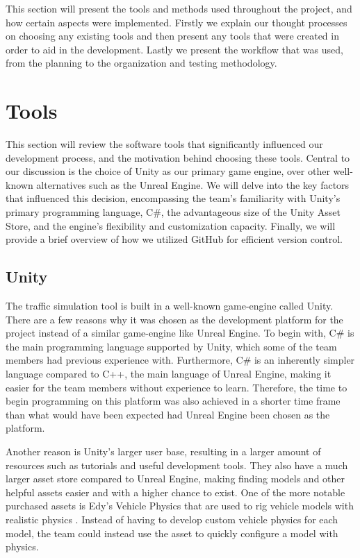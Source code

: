 
This section will present the tools and methods used throughout the project, and how certain aspects were implemented. Firstly we explain our thought processes on choosing any existing tools and then present any tools that were created in order to aid in the development. Lastly we present the workflow that was used, from the planning to the organization and testing methodology.

\section{Tools}
    This section will review the software tools that significantly influenced our development process, and the motivation behind choosing these tools. Central to our discussion is the choice of Unity as our primary game engine, over other well-known alternatives such as the Unreal Engine. We will delve into the key factors that influenced this decision, encompassing the team's familiarity with Unity's primary programming language, C\#, the advantageous size of the Unity Asset Store, and the engine's flexibility and customization capacity. Finally, we will provide a brief overview of how we utilized GitHub for efficient version control.

    \subsection{Unity}
        The traffic simulation tool is built in a well-known game-engine called Unity. There are a few reasons why it was chosen as the development platform for the project instead of a similar game-engine like Unreal Engine. To begin with, C\# is the main programming language supported by Unity, which some of the team members had previous experience with. Furthermore, C\# is an inherently simpler language compared to C++, the main language of Unreal Engine, making it easier for the team members without experience to learn. Therefore, the time to begin programming on this platform was also achieved in a shorter time frame than what would have been expected had Unreal Engine been chosen as the platform.

        Another reason is Unity's larger user base, resulting in a larger amount of resources such as tutorials and useful development tools. They also have a much larger asset store compared to Unreal Engine, making finding models and other helpful assets easier and with a higher chance to exist. One of the more notable purchased assets is Edy's Vehicle Physics that are used to rig vehicle models with realistic physics \cite{edy}. Instead of having to develop custom vehicle physics for each model, the team could instead use the asset to quickly configure a model with physics.

